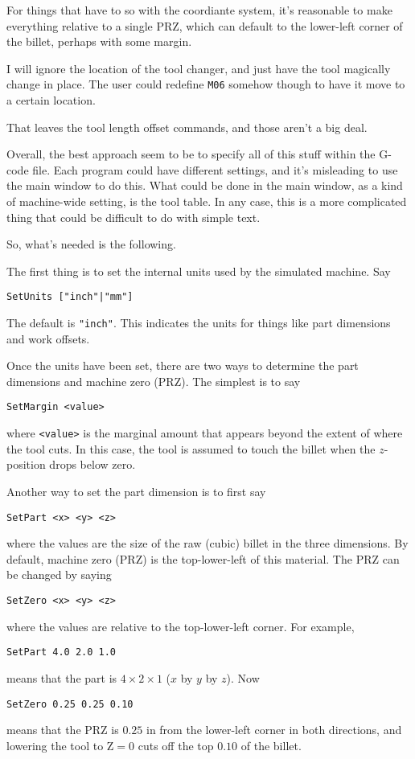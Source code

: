 \documentclass[titlepage,oneside,10pt]{article}
\begin{document}
For things that have to so with the coordiante system, it's reasonable
to make everything relative to a single PRZ, which can default to the
lower-left corner of the billet, perhaps with some margin.

I will ignore the location of the tool changer, and just have the tool
magically change in place. The user could redefine {\tt M06} somehow
though to have it move to a certain location.

That leaves the tool length offset commands, and those aren't a big
deal.

Overall, the best approach seem to be to specify all of this stuff
within the G-code file. Each program could have different settings,
and it's misleading to use the main window to do this. What could be
done in the main window, as a kind of machine-wide setting, is the
tool table. In any case, this is a more complicated thing that could
be difficult to do with simple text.

So, what's needed is the following.

The first thing is to set the internal units used by the simulated
machine. Say
\begin{verbatim}
SetUnits ["inch"|"mm"]
\end{verbatim}
The default is {\tt "inch"}. This indicates the units for things like
part dimensions and work offsets.

Once the units have been set, there are two ways to determine the part
dimensions and machine zero (PRZ). The simplest is to say
\begin{verbatim}
SetMargin <value>
\end{verbatim}
where {\tt <value>} is the marginal amount that appears beyond the
extent of where the tool cuts. In this case, the tool is assumed to
touch the billet when the $z$-position drops below zero.

Another way to set the part dimension is to first say
\begin{verbatim}
SetPart <x> <y> <z>
\end{verbatim}
where the values are the size of the raw (cubic) billet in the three
dimensions. By default, machine zero (PRZ) is the top-lower-left of
this material. The PRZ can be changed by saying
\begin{verbatim}
SetZero <x> <y> <z>
\end{verbatim}
where the values are relative to the top-lower-left corner. For example,
\begin{verbatim}
SetPart 4.0 2.0 1.0
\end{verbatim}
means that the part is $4\times2\times1$ ($x$ by $y$ by $z$). Now 
\begin{verbatim}
SetZero 0.25 0.25 0.10
\end{verbatim}
means that the PRZ is $0.25$ in from the lower-left corner in both
directions, and lowering the tool to Z$=0$ cuts off the top $0.10$ of
the billet. 
\end{document}
